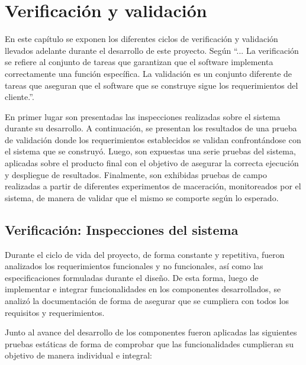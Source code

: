 \chapter{Verificación y validación}
\label{CapituloPruebas}
\par En este capítulo se exponen los diferentes ciclos de verificación y validación llevados adelante durante el desarrollo de este proyecto. Según \cite{Press10} ``... La verificación se refiere al conjunto de tareas que garantizan que el software implementa correctamente una función específica. La validación es un conjunto diferente de tareas que aseguran que el software que se construye sigue los requerimientos del cliente.''.

\par En primer lugar son presentadas las inspecciones realizadas sobre el sistema durante su desarrollo. A continuación, se presentan los resultados de una prueba de validación donde los requerimientos establecidos se validan confrontándose con el sistema que se construyó. Luego, son expuestas una serie pruebas del sistema, aplicadas sobre el producto final con el objetivo de asegurar la correcta ejecución y despliegue de resultados. Finalmente, son exhibidas pruebas de campo realizadas a partir de diferentes experimentos de maceración, monitoreados por el sistema, de manera de validar que el mismo se comporte según lo esperado.

\section{Verificación: Inspecciones del sistema}

\par Durante el ciclo de vida del proyecto, de forma constante y repetitiva, fueron analizados los requerimientos funcionales y no funcionales, así como las especificaciones formuladas durante el diseño. De esta forma, luego de implementar e integrar funcionalidades en los componentes desarrollados, se analizó la documentación de forma de asegurar que se cumpliera con todos los requisitos y requerimientos.

\par Junto al avance del desarrollo de los componentes fueron aplicadas las siguientes pruebas estáticas de forma de comprobar que las funcionalidades cumplieran su objetivo de manera individual e integral:

